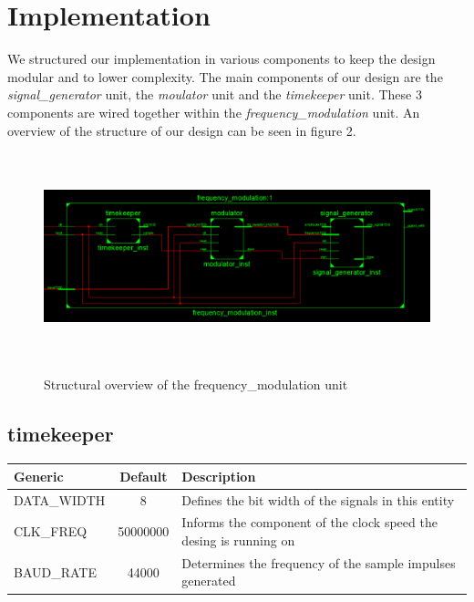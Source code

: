 \section{Implementation}

We structured our implementation in various components to keep the design modular and to lower complexity.
The main components of our design are the \textit{signal\_generator} unit, the \textit{moulator} unit and the
\textit{timekeeper} unit. These 3 components are wired together within the \textit{frequency\_modulation} unit.
An overview of the structure of our design can be seen in figure 2.

\begin{landscape}
	\begin{figure}[H] 
	    \scalebox{1.2} %
		{\includegraphics[height=6cm]{images/structure.png}} %
		\caption{Structural overview of the frequency\_modulation unit} 
		\label{fig:lorem} %
	\end{figure} 
\end{landscape}

\subsection{timekeeper}

\begin{adjustwidth}{-0.8cm}{}
	\begin{center}
		\begin{tabular}{ | l | c | l | }
			\hline
			\textbf{Generic} & \textbf{Default} & \textbf{Description} \\
			\hline
			DATA\_WIDTH & 8 & Defines the bit width of the signals in this entity \\
			CLK\_FREQ & 50000000 & Informs the component of the clock speed the desing is running on \\
			BAUD\_RATE & 44000 & Determines the frequency of the sample impulses generated \\
			\hline
		\end{tabular} 
	\end{center}
\end{adjustwidth}

